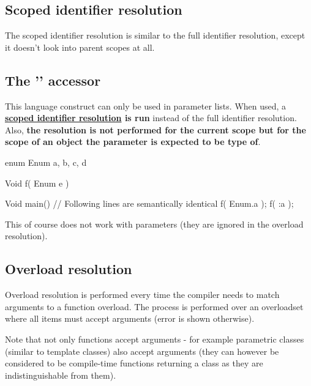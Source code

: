 \subsection{Scoped identifier resolution} \label{scopedIdentifierResolution}
The scoped identifier resolution is similar to the full identifier resolution, except it doesn't look into parent scopes at all.

\subsection{The '' accessor} \label{colonAccessor}
This language construct can only be used in parameter lists. When used, a \textbf{\hyperref[scopedIdentifierResolution]{scoped identifier resolution} is run} instead of the full identifier resolution. Also, \textbf{the resolution is not performed for the current scope but for the scope of an object the parameter is expected to be type of}.

\begin{code}
	enum Enum {
		a, b, c, d
	}
	
	Void f( Enum e ) {}
	
	Void main() {
		// Following lines are semantically identical
		f( Enum.a );
		f( :a );	
	}
\end{code}

This of course does not work with  parameters (they are ignored in the overload resolution).

\subsection{Overload resolution} \label{overloadResolution}
Overload resolution is performed every time the compiler needs to match arguments to a function overload. The process is performed over an overloadset where all items must accept arguments (error is shown otherwise).

Note that not only functions accept arguments - for example parametric classes (similar to template classes) also accept arguments (they can however be considered to be compile-time functions returning a class as they are indistinguishable from them).

